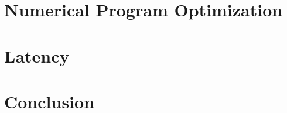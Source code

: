 








\chapter{Numerical Program Optimization}
\label{chp:progopt}

\chapter{Latency}


\chapter{Conclusion}

